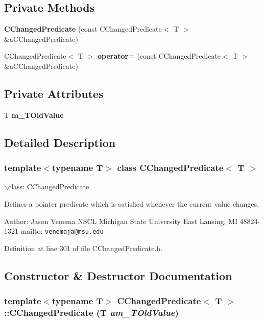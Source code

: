 \subsection*{Private Methods}
\begin{CompactItemize}
\item 
{\bf CChanged\-Predicate} (const CChanged\-Predicate$<$ T $>$ \&a\-CChanged\-Predicate)
\item 
CChanged\-Predicate$<$ T $>$ {\bf operator=} (const CChanged\-Predicate$<$ T $>$ \&a\-CChanged\-Predicate)
\end{CompactItemize}
\subsection*{Private Attributes}
\begin{CompactItemize}
\item 
T {\bf m\_\-TOld\-Value}
\end{CompactItemize}


\subsection{Detailed Description}
\subsubsection*{template$<$typename T$>$ class CChanged\-Predicate$<$ T $>$}

$\backslash$class: CChanged\-Predicate

Defines a pointer predicate which is satisfied whenever the current value changes.

Author: Jason Venema NSCL Michigan State University East Lansing, MI 48824-1321 mailto: {\tt venemaja@msu.edu} 



Definition at line 301 of file CChanged\-Predicate.h.

\subsection{Constructor \& Destructor Documentation}
\subsubsection{\setlength{\rightskip}{0pt plus 5cm}template$<$typename T$>$ CChanged\-Predicate$<$ T $>$::CChanged\-Predicate (T {\em am\_\-TOld\-Value})\hspace{0.3cm}{\tt  [inline]}}\label{classCChangedPredicate_a0}


